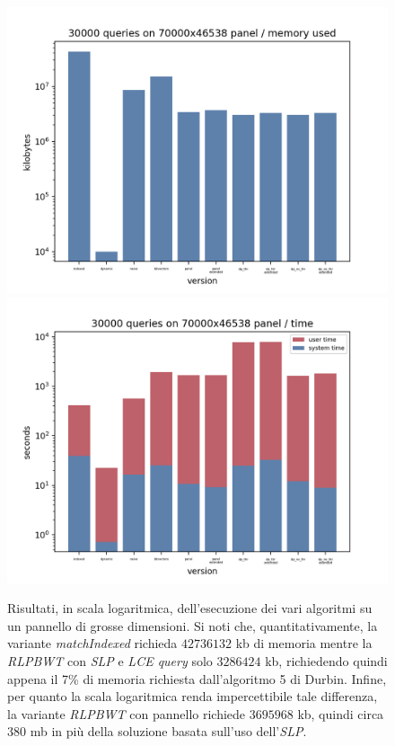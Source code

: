 \begin{figure}
  \centering
  \includegraphics[scale = 0.4]{img/mem.png}
  \includegraphics[scale = 0.4]{img/time.png}
  \caption{Risultati, in scala logaritmica, dell'esecuzione dei vari algoritmi
    su un pannello di grosse dimensioni. Si noti che, quantitativamente, la
    variante \textit{matchIndexed} richieda $42736132$ kb di memoria mentre la
    \textit{RLPBWT} con \textit{SLP} e \textit{LCE query} solo $3286424$ kb,
    richiedendo quindi appena il 7\% di memoria richiesta dall'algoritmo 5 di
    Durbin. Infine, per quanto la scala logaritmica renda impercettibile tale
    differenza, la variante \textit{RLPBWT} con pannello richiede $3695968$ kb,
    quindi circa $380$ mb in più della soluzione basata sull'uso
    dell'\textit{SLP}. } 
  \label{fig:bigres}
\end{figure}
